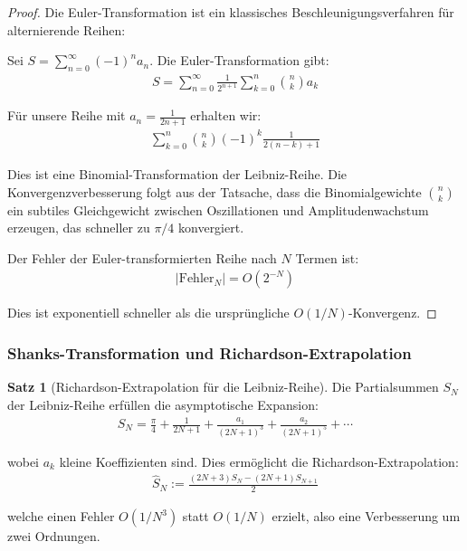 \documentclass[a4paper,12pt,twoside]{report}
\theoremstyle{definition}
\newtheorem{satz}{Satz}
\begin{document}
\begin{proof}
Die Euler-Transformation ist ein klassisches Beschleunigungsverfahren für alternierende Reihen:

Sei $S = \sum_{n=0}^{\infty} (-1)^n a_n$. Die Euler-Transformation gibt:
\begin{align}
	S = \sum_{n=0}^{\infty} \frac{1}{2^{n+1}} \sum_{k=0}^{n} \binom{n}{k} a_k
\end{align}

Für unsere Reihe mit $a_n = \frac{1}{2n+1}$ erhalten wir:
\begin{align}
	\sum_{k=0}^{n} \binom{n}{k} (-1)^k \frac{1}{2(n-k)+1}
\end{align}

Dies ist eine Binomial-Transformation der Leibniz-Reihe. Die Konvergenzverbesserung folgt aus der Tatsache, dass die Binomialgewichte $\binom{n}{k}$ ein subtiles Gleichgewicht zwischen Oszillationen und Amplitudenwachstum erzeugen, das schneller zu $\pi/4$ konvergiert.

Der Fehler der Euler-transformierten Reihe nach $N$ Termen ist:
\begin{align}
	\left| \text{Fehler}_N \right| = O(2^{-N})
\end{align}

Dies ist exponentiell schneller als die ursprüngliche $O(1/N)$-Konvergenz.
\end{proof}

\subsubsection{Shanks-Transformation und Richardson-Extrapolation}

\begin{satz}[Richardson-Extrapolation für die Leibniz-Reihe]
Die Partialsum­men $S_N$ der Leibniz-Reihe erfüllen die asymptotische Expansion:
\begin{align}
	S_N = \frac{\pi}{4} + \frac{1}{2N+1} + \frac{a_1}{(2N+1)^3} + \frac{a_2}{(2N+1)^5} + \cdots
	\label{eq:richardson_asymp}
\end{align}

wobei $a_k$ kleine Koeffizienten sind. Dies ermöglicht die Richardson-Extrapolation:
\begin{align}
	\hat{S}_N := \frac{(2N+3) S_N - (2N+1) S_{N+1}}{2}
	\label{eq:richardson_extrap}
\end{align}

welche einen Fehler $O(1/N^3)$ statt $O(1/N)$ erzielt, also eine Verbesserung um zwei Ordnungen.
\end{satz}
\end{document}
